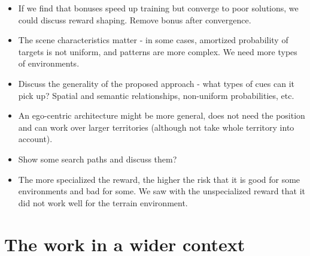\begin{itemize}
    \item If we find that bonuses speed up training but converge to poor solutions, we could discuss reward shaping. Remove bonus after convergence.
    \item The scene characteristics matter - in some cases, amortized probability of targets is not uniform, and patterns are more complex. We need more types of environments.
    \item Discuss the generality of the proposed approach - what types of cues can it pick up? Spatial and semantic relationships, non-uniform probabilities, etc. 
    \item An ego-centric architecture might be more general, does not need the position and can work over larger territories (although not take whole territory into account).
    \item Show some search paths and discuss them?
    \item The more specialized the reward, the higher the risk that it is good for some environments and bad for some. We saw with the unspecialized reward that it did not work well for the terrain environment.
\end{itemize}

\section{The work in a wider context}
\label{sec:work-wider-context}

% 


